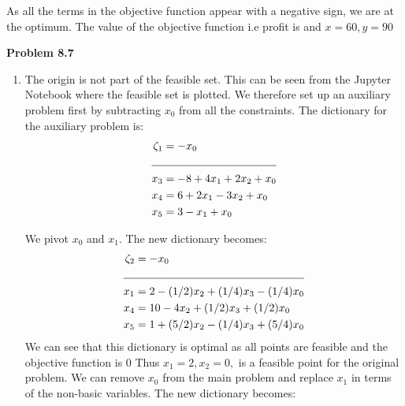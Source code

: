 \documentclass[letterpaper,12pt]{article}
\theoremstyle{definition}
\begin{document}
As all the terms in the objective function appear with a negative sign, we are at the optimum.
The value of the objective function i.e profit is  and $x=60, y=90$

\vspace{3mm}
\noindent\textbf{Problem 8.7}
\begin{enumerate}
  \item The origin is not part of the feasible set. This can be seen from the Jupyter Notebook where the
  feasible set is plotted. We therefore set up an auxiliary problem first by subtracting $x_0$ from all the
  constraints. The dictionary for the auxiliary problem is:
  \begin{align*}
    \zeta_1 &= -x_0\\
    \cline{1-2}
    x_3 &= -8 + 4x_1 + 2x_2 + x_0\\
    x_4 &= 6 + 2x_1 -3x_2+ x_0\\
    x_5 &= 3-x_1+x_0
  \end{align*}

  We pivot $x_0$ and $x_1$. The new dictionary becomes:
  \begin{align*}
    \zeta_2 &= -x_0\\
    \cline{1-2}
    x_1 &= 2 - (1/2)x_2 + (1/4)x_3-(1/4)x_0\\
    x_4 &= 10 - 4x_2 +(1/2)x_3+ (1/2)x_0\\
    x_5 &= 1+(5/2)x_2 - (1/4)x_3 + (5/4)x_0\\
  \end{align*}
  We can see that this dictionary is optimal as all points are feasible and the objective function is 0
  Thus $x_1=2, x_2=0, $ is a feasible point for the original problem. We can remove $x_0$ from the main problem
  and replace $x_1$ in terms of the non-basic variables. The new dictionary becomes:


\end{enumerate}
\end{document}
